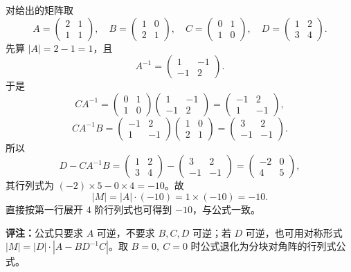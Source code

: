 对给出的矩阵取
\[
A=\begin{pmatrix}2&1\\1&1\end{pmatrix},\quad
B=\begin{pmatrix}1&0\\2&1\end{pmatrix},\quad
C=\begin{pmatrix}0&1\\1&0\end{pmatrix},\quad
D=\begin{pmatrix}1&2\\3&4\end{pmatrix}.
\]
先算 \(|A|=2-1=1\)，且
\[
A^{-1}=\begin{pmatrix}1&-1\\-1&2\end{pmatrix}.
\]
于是
\[
CA^{-1}=\begin{pmatrix}0&1\\1&0\end{pmatrix}\begin{pmatrix}1&-1\\-1&2\end{pmatrix}
=\begin{pmatrix}-1&2\\1&-1\end{pmatrix},
\]
\[
CA^{-1}B=\begin{pmatrix}-1&2\\1&-1\end{pmatrix}\begin{pmatrix}1&0\\2&1\end{pmatrix}
=\begin{pmatrix}3&2\\-1&-1\end{pmatrix}.
\]
所以
\[
D-CA^{-1}B=\begin{pmatrix}1&2\\3&4\end{pmatrix}-\begin{pmatrix}3&2\\-1&-1\end{pmatrix}
=\begin{pmatrix}-2&0\\4&5\end{pmatrix},
\]
其行列式为 \((-2)\times 5-0\times 4=-10\)。故
\[
|M|=|A|\cdot(-10)=1\times(-10)=-10.
\]
直接按第一行展开 \(4\) 阶行列式也可得到 \(-10\)，与公式一致。

\textbf{评注：}公式只要求 \(A\) 可逆，不要求 \(B,C,D\) 可逆；若 \(D\) 可逆，也可用对称形式 \(|M|=|D|\cdot|A-BD^{-1}C|\)。取 \(B=0,\ C=0\) 时公式退化为分块对角阵的行列式公式。

